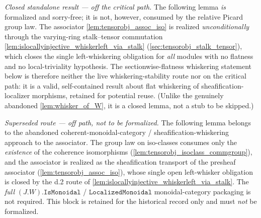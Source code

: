 \emph{Closed standalone result --- off the critical path.} The following lemma
\emph{is} formalized and sorry-free; it is not, however, consumed by the relative
Picard group law. The associator \cref{lem:tensorobj_assoc_iso} is realized
\emph{unconditionally} through the varying-ring stalk--tensor commutation
\cref{lem:islocallyinjective_whiskerleft_via_stalk}
(\cref{sec:tensorobj_stalk_tensor}), which closes the single left-whiskering
obligation for \emph{all} modules with no flatness and no local-triviality
hypothesis. The sectionwise-flatness whiskering statement below is therefore
neither the live whiskering-stability route nor on the critical path: it is a valid,
self-contained result about flat whiskering of sheafification-localizer morphisms,
retained for potential reuse. (Unlike the genuinely abandoned
\cref{lem:whisker_of_W}, it is a closed lemma, not a stub to be skipped.)

\emph{Superseded route --- off path, not to be formalized.} The following lemma
belongs to the abandoned coherent-monoidal-category / sheafification-whiskering
approach to the associator. The group law on iso-classes consumes only the
\emph{existence} of the coherence isomorphisms (\cref{lem:tensorobj_isoclass_commgroup}),
and the associator is realized as the sheafification transport of the presheaf
associator (\cref{lem:tensorobj_assoc_iso}), whose single open left-whisker obligation
is closed by the d.2 route of \cref{lem:islocallyinjective_whiskerleft_via_stalk}. The
\emph{full} \((J.W).\mathtt{IsMonoidal}\) / \(\mathtt{LocalizedMonoidal}\)
monoidal-category packaging is not required. This block is retained for the historical
record only and must \emph{not} be formalized.

